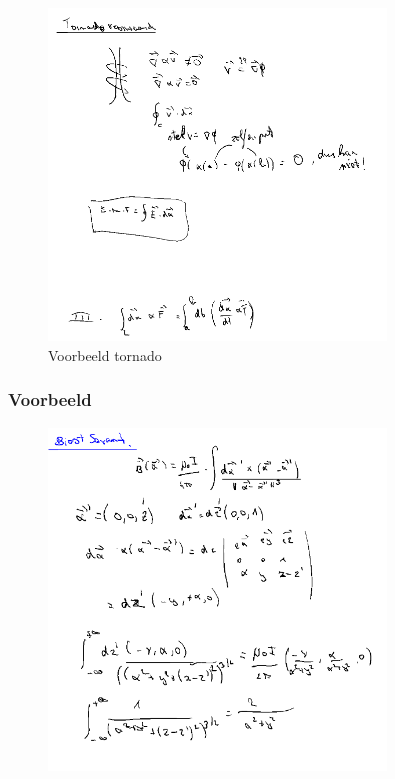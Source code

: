 \documentclass[a4paper]{article}
\begin{document}
\begin{figure}[H]
	\centering
	\includegraphics[width=0.8\textwidth]{assets/voorbeeld_tornado.png}
	\caption{Voorbeeld tornado}
	\label{fig:voorbeeld_tornado}
\end{figure}

\subsubsection{Voorbeeld}

\begin{figure}[H]
	\centering
	\includegraphics[width=0.8\textwidth]{assets/biost_savant.png}
	\caption{}
	\label{fig:biost_savant}
\end{figure}
\end{document}
